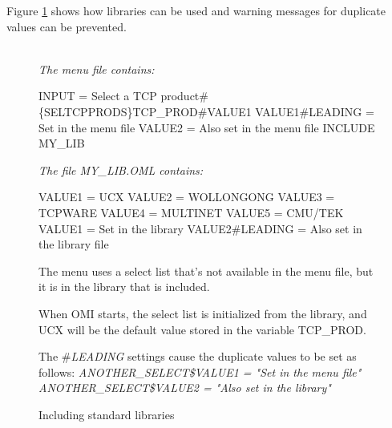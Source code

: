\documentclass[a4paper]{book}
\newcommand{\vs}{\vspace{3mm}}
\renewcommand{\indent}{\hspace*{5mm}}
\begin{document}
\vs

Figure \ref{fig:libraries} shows how libraries can be used and warning messages for 
duplicate values can be prevented.

\begin{figure}[h!tb]
\begin{minipage}[h!tb]{\textwidth}
\hrulefill \\
\textsl{The menu file contains:}

\begin{ttfamily}
 \newline
\indent INPUT = Select a TCP product{\#}{\{}SEL\textbar TCPPRODS{\}}TCP{\_}PROD{\#}VALUE1 \newline
{} \newline
\indent VALUE1{\#}LEADING = Set in the menu file \newline
\indent VALUE2 = Also set in the menu file \newline
\noindent{\#}INCLUDE MY{\_}LIB \newline
\end{ttfamily}

\textsl{The file MY{\_}LIB.OML contains:}

\begin{ttfamily}
\noindent[TCPPRODS] \newline
\indent VALUE1 = UCX \newline
\indent VALUE2 = WOLLONGONG \newline
\indent VALUE3 = TCPWARE \newline
\indent VALUE4 = MULTINET \newline
\indent VALUE5 = CMU/TEK
 \newline
\indent VALUE1 = Set in the library \newline
\indent VALUE2{\#}LEADING = Also set in the library file
\end{ttfamily}

\noindent The menu uses a select list that's not available in the menu file, but it is 
in the library that is included.

When OMI starts, the select list is initialized from the library, and UCX 
will be the default value stored in the variable TCP{\_}PROD.

The {\#}\textsl{LEADING} settings cause the duplicate values to be set as follows: \newline
\indent\textsl{ANOTHER{\_}SELECT{\$}VALUE1 = "Set in the menu file"} \newline
\indent\textsl{ANOTHER{\_}SELECT{\$}VALUE2 = "Also set in the library"}

\caption{Including standard libraries}\label{fig:libraries}
\hrulefill
\end{minipage}
\end{figure}
\end{document}
